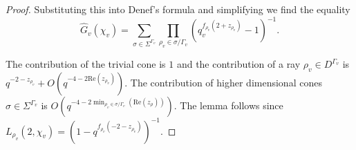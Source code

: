 \documentclass[a4paper,11pt,reqno]{amsart}
\renewcommand{\Re}{\mathrm{Re}}
\theoremstyle{definition}
\begin{document}
\begin{proof}
	Substituting this into Denef's formula \cite[Prop. 4.5]{Chambert-Loir2010Integral} and simplifying we find the equality
	\begin{equation*}
		\hat{G}_v(\chi_v) = \sum_{\sigma \in \Sigma^{\Gamma_v}} \prod_{\rho_v \in \sigma / \Gamma_v} (q_v^{f_{\rho_v}(2 + z_{\rho_v})} - 1)^{-1}.
	\end{equation*}
	
	The contribution of the trivial cone is $1$ and the contribution of a ray $\rho_v \in D^{\Gamma_v}$ is $q^{-2 - z_{\rho_v}} + O(q^{- 4 - 2 \Re(z_{\rho_v})})$. The contribution of higher dimensional cones $\sigma \in \Sigma^{\Gamma_v}$ is $O(q^{- 4 - 2 \min_{\rho_v \in \sigma / \Gamma_v}(\Re(z_{\rho}))})$. The lemma follows since $L_{\rho_v}(2, \chi_v) = (1 - q^{f_{\rho_v}(-2 - z_{\rho_v})})^{-1}$.
\end{proof}
\end{document}
